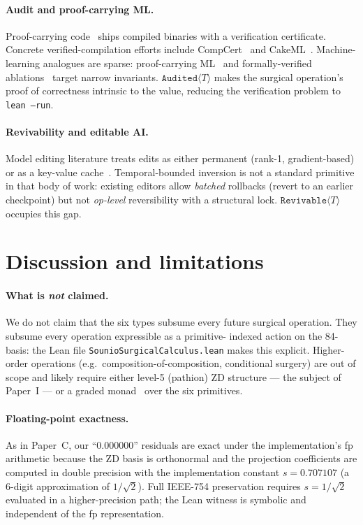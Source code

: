\documentclass{article}
\newcommand{\Audited}[1]{\texttt{Audited}\langle #1 \rangle}
\newcommand{\Revivable}[1]{\texttt{Revivable}\langle #1 \rangle}
\begin{document}
\paragraph{Audit and proof-carrying ML.}
Proof-carrying code~\cite{necula1997proofcarrying} ships compiled
binaries with a verification certificate.  Concrete verified-compilation
efforts include CompCert~\cite{leroy2009compcert} and
CakeML~\cite{kumar2014cakeml}.  Machine-learning analogues are sparse:
proof-carrying ML~\cite{seshia2022toward} and formally-verified
ablations~\cite{elhage2021mathematical} target narrow invariants.
$\Audited{T}$ makes the surgical operation's proof of correctness
intrinsic to the value, reducing the verification problem to
\texttt{lean --run}.

\paragraph{Revivability and editable AI.}
Model editing literature treats edits as either permanent (rank-1,
gradient-based) or as a key-value cache~\cite{mitchell2022memorybased}.
Temporal-bounded inversion is not a standard primitive in that body
of work: existing editors allow \emph{batched} rollbacks (revert to
an earlier checkpoint) but not \emph{op-level} reversibility with a
structural lock.  $\Revivable{T}$ occupies this gap.

\section{Discussion and limitations}

\paragraph{What is \emph{not} claimed.}
We do not claim that the six types subsume every future surgical
operation.  They subsume every operation expressible as a primitive-
indexed action on the 84-basis: the Lean file
\texttt{SounioSurgicalCalculus.lean} makes this explicit.  Higher-order
operations (e.g.\ composition-of-composition, conditional surgery)
are out of scope and likely require either level-5 (pathion) ZD
structure --- the subject of Paper~I --- or a graded
monad~\cite{katsumata2014parametric} over the six primitives.

\paragraph{Floating-point exactness.}
As in Paper~C, our ``$0.000000$'' residuals are exact under the
implementation's fp arithmetic because the ZD basis is orthonormal
and the projection coefficients are computed in double precision with
the implementation constant $s = 0.707107$ (a 6-digit approximation of
$1/\sqrt{2}$).  Full IEEE-754 preservation requires $s = 1/\sqrt{2}$
evaluated in a higher-precision path; the Lean witness is symbolic
and independent of the fp representation.
\end{document}
